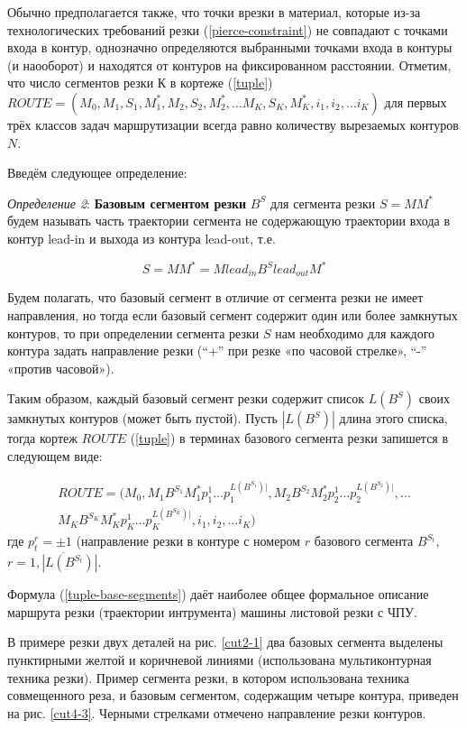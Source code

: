 \documentclass[12pt,twoside]{report}
\begin{document}
Обычно предполагается также,
что точки врезки в материал,
которые из-за технологических требований резки
(\ref{pierce-constraint})
не совпадают с точками входа в контур,
однозначно определяются выбранными точками входа в контуры (и наооборот)
и находятся от контуров на фиксированном расстоянии.
Отметим, что число сегментов резки К в кортеже (\ref{tuple})
$ROUTE = (
  M_0, M_1, S_1, M_1^*, M_2, S_2, M_2^*, \dots M_K, S_K, M_K^*, i_1, i_2, \dots i_K
)$
для первых трёх классов задач маршрутизации всегда равно количеству вырезаемых контуров $N$.

Введём следующее определение:



{\it Определение 2}:
{\bf Базовым сегментом резки}
$B^S$
для сегмента резки
$S=MM^*$
будем называть часть траектории сегмента
не содержающую траектории входа в контур
lead-in и выхода из контура lead-out, т.е.

\begin{equation}
S=MM^* = M lead_{in} B^S lead_{out} M^*
\label{base-segment}
\end{equation}

Будем полагать,
что базовый сегмент в отличие от сегмента резки
не имеет направления,
но тогда если базовый сегмент содержит
один или более замкнутых контуров,
то при определении сегмента резки $S$
нам необходимо для каждого контура задать направление резки
(“+” при резке «по часовой стрелке», “-” «против часовой»).

Таким образом,
каждый базовый сегмент резки
содержит список
$L(B^S)$
своих замкнутых контуров (может быть пустой).
Пусть
$|L(B^S)|$
длина этого списка, тогда кортеж $ROUTE$ (\ref{tuple})
в терминах базового сегмента резки запишется в следующем виде:

\begin{multline}
  ROUTE = (
    M_0, M_1 B^{S_1} M_1^* p_1^1 \dots p_1^{L(B^{S_1})|},
    M_2 B^{S_2} M_2^* p_2^1 \dots p_2^{L(B^{S_2})|},
    \dots \\
    M_K B^{S_K} M_K^* p_K^1 \dots p_K^{L(B^{S_K})|},
    i_1, i_2, \dots i_K
  )
  \label{tuple-base-segments}
\end{multline}
где $p_t^r=\pm 1$
(направление резки в контуре с номером $r$ базового сегмента  $B^{S_t}$,
$r=\overline{1, |L(B^{S_t})|}$.

Формула (\ref{tuple-base-segments})
даёт наиболее общее формальное описание маршрута резки (траектории интрумента)
машины листовой резки с ЧПУ.

В примере резки двух деталей
на рис. \ref{cut2-1}
два базовых сегмента выделены пунктирными
желтой и коричневой линиями
(использована мультиконтурная техника резки).
Пример сегмента резки, в котором использована техника совмещенного реза,
и  базовым сегментом, содержащим четыре контура,
приведен на рис. \ref{cut4-3}.
Черными стрелками отмечено направление резки контуров.
\end{document}
